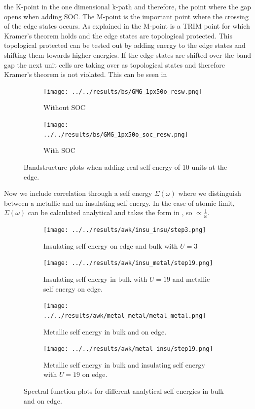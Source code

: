 \documentclass[a4paper,11pt]{report}
\begin{document}
the K-point in the one dimensional k-path and therefore, the point where the gap opens when adding SOC. The M-point is the important point
where the crossing of the edge states occurs. As explained in  the M-point is a TRIM point for which Kramer's theorem holds
and the edge states are topological protected. This topological protected can be tested out by adding energy to the edge states and shifting them towards
higher energies. If the edge states are shifted over the band gap the next unit cells are taking over as topological states and therefore Kramer's
theorem is not violated. This can be seen in 
\begin{figure}[H]
\centering
\begin{subfigure}{.49\textwidth}
  \centering
  \texttt{[image: ../../results/bs/GMG\_1px50o\_resw.png]}
  \label{f:GMG_1px50o_resw}
  \caption{Without SOC}
\end{subfigure}
\begin{subfigure}{.49\textwidth}
  \raggedleft
  \texttt{[image: ../../results/bs/GMG\_1px50o\_soc\_resw.png]}
  \label{f:GMG_1px50o_soc_resw}
  \caption{With SOC}
\end{subfigure}
\caption{Bandstructure plots when adding real self energy of 10 units at the edge.}
\label{f:resw}
\end{figure}
Now we include correlation through a self energy $\Sigma(\omega)$ where we distinguish between a metallic and an insulating self energy. In the case
of atomic limit, $\Sigma(\omega)$ can be calculated analytical and takes the form in , so $\propto \frac{1}{\omega}$. 
\begin{figure}[H]
\centering
\begin{subfigure}{.49\textwidth}
  \centering
  \texttt{[image: ../../results/awk/insu\_insu/step3.png]}
  \label{fig:insul-insul}
  \caption{Insulating self energy on edge and bulk with $U = 3$}
\end{subfigure}
\begin{subfigure}{.49\textwidth}
  \raggedleft
  \texttt{[image: ../../results/awk/insu\_metal/step19.png]}
  \label{fig:insul-metal}
  \caption{Insulating self energy in bulk with $U = 19$ and metallic self energy on edge.}
\end{subfigure}
\begin{subfigure}{.49\textwidth}
  \centering
  \texttt{[image: ../../results/awk/metal\_metal/metal\_metal.png]}
  \label{fig:metal-metal}
  \caption{Metallic self energy in bulk and on edge.}
\end{subfigure}
\begin{subfigure}{.49\textwidth}
  \raggedleft
  \texttt{[image: ../../results/awk/metal\_insu/step19.png]}
  \label{fig:metal-insul}
  \caption{Metallic self energy in bulk and insulating self energy with $U = 19$ on edge.}
\end{subfigure}
\caption[]{Spectral function plots for different analytical self energies in bulk and on edge.}
\label{fig:awk}
\end{figure}
\end{document}
